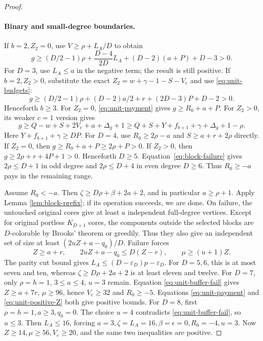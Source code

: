 \documentclass[11pt,a4paper]{article}
\theoremstyle{definition}
\begin{document}
\begin{proof}
\paragraph{Binary and small-degree boundaries.}
If $b=2,Z_2=0$, use $V\ge\rho+L_A/D$ to obtain
\[
g\ge(D/2-1)\rho+\frac{D-4}{2D}L_A+(D-2)(a+P)+D-3>0.
\]
For $D=3$, use $L_A\le a$ in the negative term; the result is still positive.
If $b=2,Z_2>0$, substitute the exact
$Z_2=w+\gamma-1-S-V_e$ and use \eqref{eq:unit-budgets}:
\[
g\ge(D/2-1)\rho+(D-2)a/2+r+(2D-3)P+D-2>0.
\]
Henceforth $b\ge3$.
For $Z_2=0$, \eqref{eq:unit-payment} gives $g\ge R_0+a+P$.
For $Z_2>0$, its weaker $c=1$ version gives
\begin{equation}\label{eq:unit-positive-Z}
 g\ge Q-w+S+2V_e+a+\Delta_g+1
 \ge Q+S+Y+f_{b+1}+\gamma+\Delta_g+1-\rho.
\end{equation}
Here $Y+f_{b+1}+\gamma\ge DP$.
For $D=4$, use $R_0\ge2\rho-a$ and $S\ge a+r+2\rho$ directly.
If $Z_2=0$, then $g\ge R_0+a+P\ge2\rho+P>0$.
If $Z_2>0$, then $g\ge2\rho+r+4P+1>0$.
Henceforth $D\ge5$. Equation~\eqref{eq:block-failure} gives
$2\rho\le D+1$ in odd degree and $2\rho\le D+4$ in even degree $D\ge6$.
Thus $R_0\ge-a$ pays in the remaining range.

Assume $R_0<-a$. Then
$\zeta\ge D\rho+\beta+2a+2$, and in particular $a\ge\rho+1$.
Apply Lemma \ref{lem:block-prefix}; if its operation succeeds, we are done.
On failure, the untouched original cores give at least $a$ independent full-degree vertices.
Except for original portless $K_{D+1}$ cores, the components outside the selected blocks are $D$-colorable by Brooks' theorem or greedily. Thus they also give an independent set of size at least $(2uZ+a-q_0)/D$.
Failure forces
\begin{equation}\label{eq:unit-buffer-fail}
 Z\ge a+r,\qquad 2uZ+a-q_0\le D(Z-r),\qquad \mu\ge(u+1)Z.
\end{equation}
The parity cut bound gives $L_A\le(D-\varepsilon_D)p-\varepsilon_D$.
For $D=5,6$, this is at most seven and ten, whereas $\zeta\ge D\rho+2a+2$ is at least eleven and twelve.
For $D=7$, only $\rho=h=1$, $3\le a\le4$, $u=3$ remain.
Equation \eqref{eq:unit-buffer-fail} gives $Z\ge a+7r$, $\mu\ge96$, hence $V_e\ge32$ and $R_0\ge-5$.
Equations \eqref{eq:unit-payment} and \eqref{eq:unit-positive-Z} both give positive bounds.
For $D=8$, first $\rho=h=1,a\ge3,q_0=0$. The choice $u=4$ contradicts \eqref{eq:unit-buffer-fail}, so $u\le3$.
Then $L_A\le16$, forcing $a=3,\zeta=L_A=16,\beta=\epsilon=0,R_0=-4,u=3$.
Now $Z\ge14,\mu\ge56,V_e\ge20$, and the same two inequalities are positive.


\end{proof}
\end{document}
